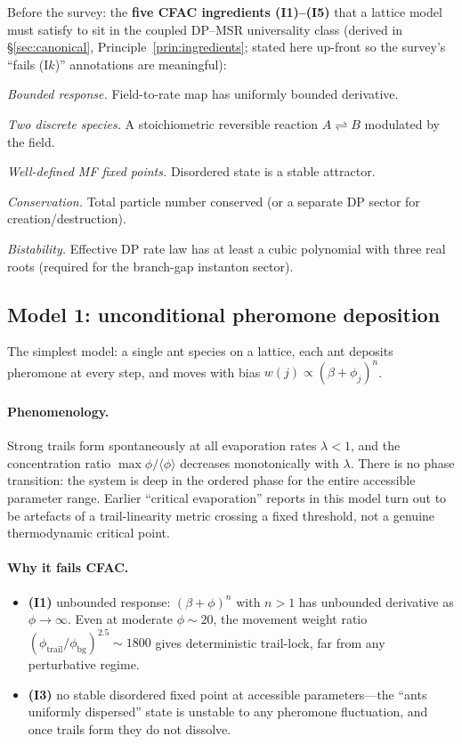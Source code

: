 \documentclass[10pt,a4paper,twocolumn]{article}
\newcommand{\avg}[1]{\langle #1 \rangle}
\theoremstyle{definition}
\begin{document}
Before the survey: the \textbf{five CFAC ingredients (I1)--(I5)}
that a lattice model must satisfy to sit in the coupled DP--MSR
universality class (derived in \S\ref{sec:canonical},
Principle~\ref{prin:ingredients}; stated here up-front so the
survey's ``fails (I$k$)'' annotations are meaningful):
\begin{description}[leftmargin=1.3cm,itemsep=2pt]
  \item[(I1)] \emph{Bounded response.}  Field-to-rate map has
    uniformly bounded derivative.
  \item[(I2)] \emph{Two discrete species.}  A stoichiometric
    reversible reaction $A \rightleftharpoons B$ modulated by
    the field.
  \item[(I3)] \emph{Well-defined MF fixed points.}  Disordered
    state is a stable attractor.
  \item[(I4)] \emph{Conservation.}  Total particle number
    conserved (or a separate DP sector for creation/destruction).
  \item[(I5)] \emph{Bistability.}  Effective DP rate law has at
    least a cubic polynomial with three real roots (required for
    the branch-gap instanton sector).
\end{description}

\subsection{Model 1: unconditional pheromone deposition}
The simplest model: a single ant species on a lattice, each ant
deposits pheromone at every step, and moves with bias
$w(j) \propto (\beta + \phi_j)^n$.

\paragraph{Phenomenology.}
Strong trails form spontaneously at all evaporation rates
$\lambda < 1$, and the concentration ratio
$\max\phi/\avg\phi$ decreases monotonically with $\lambda$.
There is no phase transition: the system is deep in the ordered
phase for the entire accessible parameter range.  Earlier
``critical evaporation'' reports in this model turn out to be
artefacts of a trail-linearity metric crossing a fixed
threshold, not a genuine thermodynamic critical point.

\paragraph{Why it fails CFAC.}
\begin{itemize}
  \item \textbf{(I1)} unbounded response: $(\beta+\phi)^n$ with
    $n > 1$ has unbounded derivative as $\phi \to \infty$.
    Even at moderate $\phi\sim 20$, the movement weight ratio
    $(\phi_{\text{trail}}/\phi_{\text{bg}})^{2.5} \sim 1800$
    gives deterministic trail-lock, far from any perturbative
    regime.
  \item \textbf{(I3)} no stable disordered fixed point at
    accessible parameters---the ``ants uniformly dispersed''
    state is unstable to any pheromone fluctuation, and once
    trails form they do not dissolve.
\end{itemize}
\end{document}
